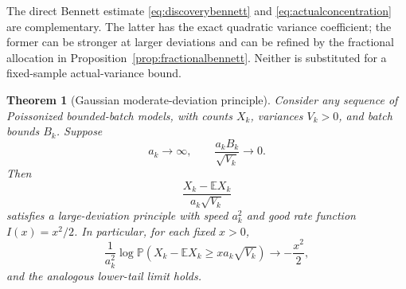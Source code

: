 \documentclass[11pt]{article}
\numberwithin{equation}{section}
\newtheorem{theorem}{Theorem}[section]
\theoremstyle{definition}
\theoremstyle{remark}
\newcommand{\E}{\mathbb E}
\newcommand{\Pp}{\mathbb P}
\begin{document}
The direct Bennett estimate \eqref{eq:discoverybennett} and
\eqref{eq:actualconcentration} are complementary. The latter has the exact
quadratic variance coefficient; the former can be stronger at larger deviations
and can be refined by the fractional allocation in
Proposition~\ref{prop:fractionalbennett}. Neither is substituted for a
fixed-sample actual-variance bound.

\begin{theorem}[Gaussian moderate-deviation principle]\label{thm:MDP}
Consider any sequence of Poissonized bounded-batch models, with counts $X_k$,
variances $V_k>0$, and batch bounds $B_k$. Suppose
\[
 a_k\longrightarrow\infty,\qquad
 \frac{a_kB_k}{\sqrt{V_k}}\longrightarrow0.
\]
Then
\[
 \frac{X_k-\E X_k}{a_k\sqrt{V_k}}
\]
satisfies a large-deviation principle with speed $a_k^2$ and good rate function
$I(x)=x^2/2$. In particular, for each fixed $x>0$,
\begin{equation}\label{eq:MDPtail}
 \frac1{a_k^2}\log\Pp(X_k-\E X_k\ge xa_k\sqrt{V_k})
 \longrightarrow-\frac{x^2}{2},
\end{equation}
and the analogous lower-tail limit holds.
\end{theorem}
\end{document}
